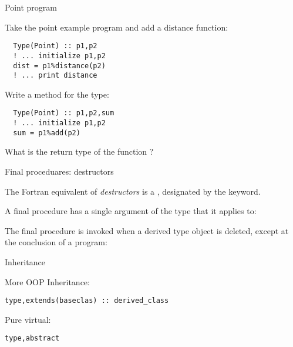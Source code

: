 \begin{block}{Point program}
  \label{sl:fpoint-program}
  \footnotesize
  
  \begin{multicols}{2}
    \columnbreak
  \end{multicols}  
\end{block}

\begin{exercise}
  \label{ex:fclass-point-distance}
  Take the point example program and add a distance function:
\begin{lstlisting}
  Type(Point) :: p1,p2
  ! ... initialize p1,p2
  dist = p1%distance(p2)
  ! ... print distance
\end{lstlisting}
\end{exercise}

\begin{exercise}
  \label{ex:fclass-translate}
  Write a method  for the  type:
\begin{lstlisting}
  Type(Point) :: p1,p2,sum
  ! ... initialize p1,p2
  sum = p1%add(p2)
\end{lstlisting}
  What is the return type of the function ?
\end{exercise}

 {Final proceduares: destructors}

The Fortran equivalent of
\emph{destructors}
is a ,
designated by the  keyword.


A final procedure has a single argument of the type that it applies to:


The final procedure is invoked when a derived type object is deleted,
except at the conclusion of a program:


 {Inheritance}

\begin{block}{More OOP}
  \label{sl:oopf}
Inheritance:
\begin{lstlisting}
type,extends(baseclas) :: derived_class
\end{lstlisting}
Pure virtual:
\begin{lstlisting}
type,abstract
\end{lstlisting}
\end{block}

